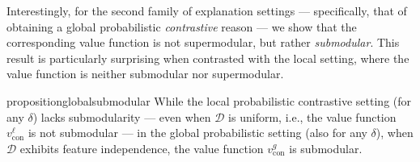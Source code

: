 \documentclass{article}
\newtheorem{observation}{Observation}
\newtheorem{proposition}{Proposition}
\begin{document}
Interestingly, for the second family of explanation settings --- specifically, that of obtaining a global probabilistic \emph{contrastive} reason --- we show that the corresponding value function is not supermodular, but rather \emph{submodular}. This result is particularly surprising when contrasted with the local setting, where the value function is neither submodular nor supermodular.

\begin{restatable}{proposition}{globalsubmodular} \label{globalsubmodular_prop}
While the local probabilistic contrastive setting (for any $\delta$) lacks submodularity --- even when $\mathcal{D}$ is uniform, i.e., the value function $v^{\ell}_{\text{con}}$ is not submodular --- in the global probabilistic setting (also for any $\delta$), when $\mathcal{D}$ exhibits feature independence, the value function $v^g_{\text{con}}$ is submodular.
\end{restatable}












\end{document}
